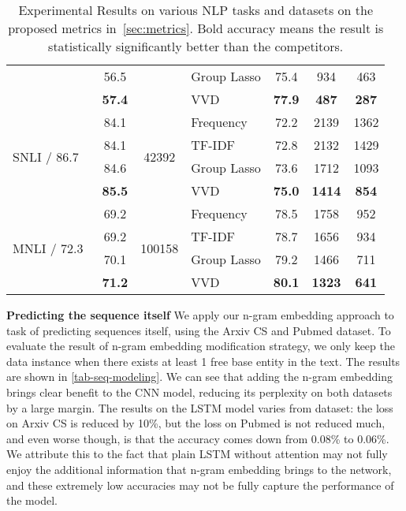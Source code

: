 \begin{table*}[thb]
\begin{tabular}{lcclccc}
                             & 56.5       &                        & Group Lasso         &    75.4       &  934       &     463     \\
                             & \textbf{57.4}       &                        & VVD & \textbf{77.9}      & \textbf{487} & \textbf{287}   \\
\midrule
\midrule
\multirow{4}{*}{SNLI / 86.7~\cite{DBLP:conf/naacl/WilliamsNB18}} & 84.1     &  \multirow{4}{*}{42392} & Frequency           &   72.2   &   2139      &  1362 \\
                      & 84.1     &                        & TF-IDF              &  72.8    &    2132   &      1429 \\
                      & 84.6     &                        & Group Lasso         &  73.6    &    1712  &      1093 \\
                      & \textbf{85.5}     &                        & VVD & \textbf{75.0} & \textbf{1414} & \textbf{854}  \\
\midrule
\multirow{4}{*}{MNLI / 72.3~\cite{DBLP:conf/naacl/WilliamsNB18}} & 69.2     &  \multirow{4}{*}{100158} & Frequency           &   78.5   & 1758         &  952        \\
& 69.2     &                        & TF-IDF              &   78.7  &   1656      & 934 \\
& 70.1     &                        & Group Lasso         &   79.2    & 1466         &  711 \\
& \textbf{71.2}     &                        & VVD &  \textbf{80.1} &  \textbf{1323}  & \textbf{641} \\
\bottomrule
\end{tabular}
\caption{Experimental Results on various NLP tasks and datasets on the proposed metrics in~\autoref{sec:metrics}. Bold accuracy means the result is statistically significantly better than the competitors. }
\label{tab:result}
\end{table*}




\noindent \textbf{Predicting the sequence itself}
We apply our n-gram embedding  approach to task of predicting sequences itself, using the Arxiv CS and Pubmed dataset. To evaluate the result of n-gram embedding modification strategy, we only keep the data instance when there exists at least 1 free base entity in the text. The results are shown in \autoref{tab-seq-modeling}. We can see that adding the n-gram embedding brings clear benefit to the CNN model, reducing its perplexity on both datasets by a large margin. The results on the LSTM model varies from dataset: the loss on Arxiv CS is reduced by 10\%, but the loss on Pubmed is not reduced much, and even worse though, is that the accuracy comes down from 0.08\% to 0.06\%. 
 We attribute this to the fact that plain LSTM without attention may not fully enjoy the additional information that n-gram embedding brings to the network, and these extremely low accuracies may not be fully capture the performance of the model.





